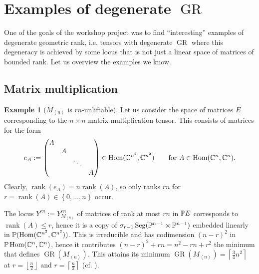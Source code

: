 \documentclass[a4paper,10pt]{article}
\def\floor#1{\left\lfloor#1\right\rfloor}
\def\ceil#1{\left\lceil#1\right\rceil}
\def\set#1{\left\{#1\right\}}
\def\gener#1{\left\langle#1\right\rangle}
\def\mtrx#1{\begin{pmatrix}#1\end{pmatrix}}
\DeclareMathOperator{\Hom}{Hom}\let\hom\Hom
\DeclareMathOperator{\rank}{rank}\let\rk\rank
\DeclareMathOperator{\Seg}{Seg}
\DeclareMathOperator{\GR}{GR}
\def\uv#1{``#1''}
\theoremstyle{definition}
\newtheorem{example}[theorem]{Example}
\theoremstyle{remark}
\begin{document}
\section{Examples of degenerate $\GR$}
\label{sec:examples}

One of the goals of the workshop project was to find \uv{interesting} examples of degenerate geometric rank, i.e. tensors with degenerate $\GR$ where this degeneracy is achieved by some locus that is not just a linear space of matrices of bounded rank. Let us overview the examples we know.

\subsection{Matrix multiplication}

\begin{example}[$M_{\gener n}$ is $rn$-unliftable]
    Let us consider the space of matrices $E$ corresponding to the $n\times n$ matrix multiplication tensor. This consists of matrices for the form
    \[
        e_A := \mtrx{A&&&\\&A&&\\&&\ddots&\\&&&A} \in \Hom(\ce^{n^2}, \ce^{n^2})\qquad \text{for $A\in\Hom(\ce^n, \ce^n)$.}
    \]
    Clearly, $\rank(e_A) = n \rank(A)$, so only ranks $rn$ for $r=\rank(A)\in\set{0,\dots,n}$ occur.

    The locus $Y^{rn}:=Y^{rn}_{M_{\gener n}}$ of matrices of rank at most $rn$ in $\pe E$ corresponds to $\rank(A)\leq r$, hence it is a copy of $\sigma_{r-1}\Seg(\pe^{n-1}\times\pe^{n-1})$ embedded linearly in $\pe(\Hom(\ce^{n^2}, \ce^{n^2}))$. This is irreducible and has codimension $(n-r)^2$ in $\pe\Hom(\ce^n,\ce^n)$, hence it contributes $(n-r)^2+rn = n^2-rn+r^2$ the minimum that defines $\GR(M_{\gener n})$. This attains its minimum $\GR(M_{\gener n})=\ceil{\frac34n^2}$ at $r=\floor{\frac n2}$ and $r=\ceil{\frac n2}$ (cf. \cite[Theorem 6.1]{kopparty-moshkovitz-zuiddam}).


\end{example}
\end{document}

